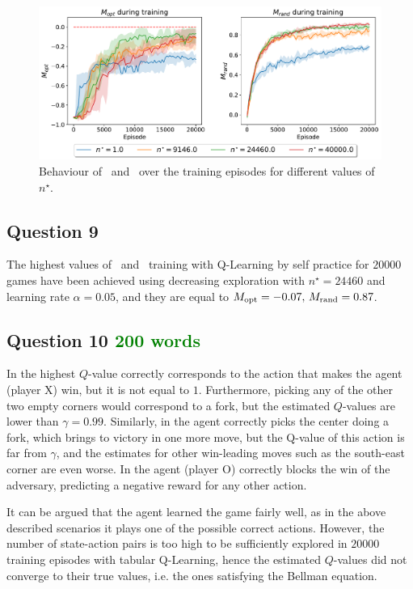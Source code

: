 \documentclass[10pt]{IEEEtran}
\begin{document}
\begin{figure}[h]
    \centering
    \includegraphics[width=\linewidth]{code/figures/performance_n_star_self.pdf}
    \caption{Behaviour of \mopt\ and \mrand\ over the training episodes for different values of $n^{\star}$.}
    \label{plot_question8}
\end{figure}

\subsection*{Question 9}
The highest values of \mopt\  and \mrand\  training with Q-Learning by self practice for $20000$ games have been achieved using decreasing exploration with $n^{\star} = 24460$ and learning rate $\alpha = 0.05$, and they are equal to $M_{\text{opt}} = -0.07, \, M_{\text{rand}} = 0.87$.

\subsection*{Question 10  \textcolor{Green}{200 words}}
In  the highest $Q$-value correctly corresponds to the action that makes the agent (player X) win, but it is not equal to $1$. Furthermore, picking any of the other two empty corners would correspond to a fork, but the estimated $Q$-values are lower than $\gamma = 0.99$. Similarly, in  the agent correctly picks the center doing a fork, which brings to victory in one more move, but the Q-value of this action is far from $\gamma$, and the estimates for other win-leading moves such as the south-east corner are even worse. In  the agent (player O) correctly blocks the win of the adversary, predicting a negative reward for any other action.

It can be argued that the agent learned the game fairly well, as in the above described scenarios it plays one of the possible correct actions. However, the number of state-action pairs is too high to be sufficiently explored in $20000$ training episodes with tabular Q-Learning, hence the estimated $Q$-values did not converge to their true values, i.e. the ones satisfying the Bellman equation. 
\end{document}
